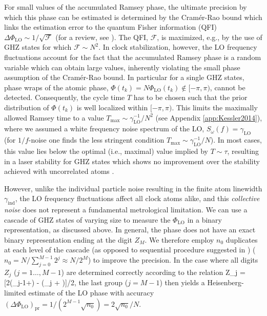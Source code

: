 For small values of the accumulated Ramsey phase, the ultimate precision by
which this phase can be estimated is determined by the Cram\'{e}r-Rao bound
\cite{Rao1945,Giovanetti2011} which 
links the estimation error to the quantum Fisher information (QFI)
$\Delta\Phi_\mathrm{LO} \sim 1/\sqrt{\mathcal F}$ (for a review, see
\cite{Giovanetti2011}). The QFI, $\mathcal F$, is maximized, e.g., by the use of
GHZ states for which $\mathcal F \sim N^2$.
In clock stabilization, however, the LO frequency fluctuations account for the
fact that the accumulated Ramsey phase is a random variable which can obtain
large values, inherently violating the small phase assumption of the
Cram\'{e}r-Rao bound.
In particular for a single GHZ states, phase wraps of the atomic phase,
$\Phi(t_k)=N \Phi_\mathrm{LO}(t_k)\notin[-\pi,\pi)$, cannot be detected.
Consequently, the cycle time $T$ has to be
chosen such that the prior distribution of $\Phi(t_k)$ is well localized
within $[-\pi,\pi)$.
This limits the maximally allowed Ramsey time to a value $T_\mathrm{max}
\sim\gamma_\mathrm{LO}^{-1}/N^2$ (see 
Appendix \ref{app:Kessler2014}), where we assumed a white frequency noise
spectrum of the LO, $S_\omega(f) = \gamma_\mathrm{LO}$ (for $1/f$-noise one finds the less stringent
condition $T_\mathrm{max} \sim\gamma_\mathrm{LO}^{-1}/N$). In most cases, this value
lies below the optimal (i.e., maximal) value implied by
 $T\sim\tau$, resulting in a laser stability for GHZ
states which shows no improvement over the stability achieved with uncorrelated
atoms \cite{Wineland1998, Rosenband2012_numerical}.

However, unlike the individual particle noise resulting in the finite atom
linewidth $\gamma_\mathrm{ind}$, the LO frequency fluctuations affect all clock
atoms alike, and this \textit{collective noise} does not represent a fundamental
metrological limitation.
We can use a cascade of GHZ states of varying size to measure the
$\Phi_\mathrm{LO}$ in a binary representation, as discussed above.
In general, the phase does not have an exact binary representation ending at the
digit $Z_{M}$. We therefore employ $n_0$ duplicates  at each level of the
cascade (as opposed to sequential procedure suggested in \cite{Giovannetti2006})
($n_0 =N/\sum_{j=0}^{M-1} 2^j \approx N/2^M$) to improve the precision.
 In the case where all digits $Z_j$ ($j=1\dots, M-1$) are determined correctly
 according to the relation
\bel
Z_j =
[2(\Phi_{j-1}+\pi) - (\Phi_j + \pi)]/2\pi,
\eel
the last group ($j=M-1$) then yields a Heisenberg-limited estimate of
the LO phase with accuracy $(\Delta\Phi_\mathrm{LO})_\mathrm{pr} =
1/(2^{M-1} \sqrt{n_0}) = 2\sqrt{n_0}/N$.

